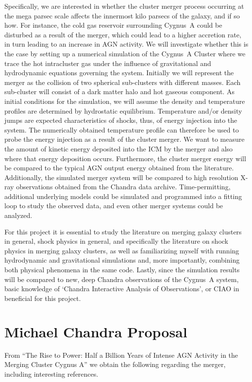 \documentclass[MScProj_TLRH_ClusterEnergy.tex]{subfiles}
\begin{document}
Specifically, we are interested in whether the cluster merger process occurring at the mega parsec scale affects the innermost kilo parsecs of the galaxy, and if so how. For instance, the cold gas reservoir surrounding Cygnus~A could be disturbed as a result of the merger, which could lead to a higher accretion rate, in turn leading to an increase in AGN activity. We will investigate whether this is the case by setting up a numerical simulation of the Cygnus~A Cluster where we trace the hot intracluster gas under the influence of gravitational and hydrodynamic equations governing the system. Initially we will represent the merger as the collision of two spherical sub-clusters with different masses. Each sub-cluster will consist of a dark matter halo and hot gaseous component. As initial conditions for the simulation, we will assume the density and temperature profiles are determined by hydrostatic equilibrium. Temperature and/or density jumps are expected characteristics of shocks, thus, of energy injection into the system. The numerically obtained temperature profile can therefore be used to probe the energy injection as a result of the cluster merger. We want to measure the amount of kinetic energy deposited into the ICM by the merger and also where that energy deposition occurs. Furthermore, the cluster merger energy will be compared to the typical AGN output energy obtained from the literature. Additionally, the simulated merger system will be compared to high resolution X-ray observations obtained from the Chandra data archive. Time-permitting, additional underlying models could be simulated and programmed into a fitting loop to study the observed data, and even other merger systems could be analyzed.

For this project it is essential to study the literature on merging galaxy clusters in general, shock physics in general, and specifically the literature on shock physics in merging galaxy clusters, as well as familiarizing myself with running hydrodynamic and gravitational simulations and, more importantly, combining both physical phenomena in the same code. Lastly, since the simulation results will be compared to new, deep Chandra observations of the Cygnus~A system, basic knowledge of `Chandra Interactive Analysis of Observations', or CIAO in beneficial for this project.

\section{Michael Chandra Proposal}
From ``The Rise to Power: Half a Billion Years of Intense AGN Activity in the Merging Cluster Cygnus A'' we obtain the following regarding the merger, including interesting references.
\end{document}
